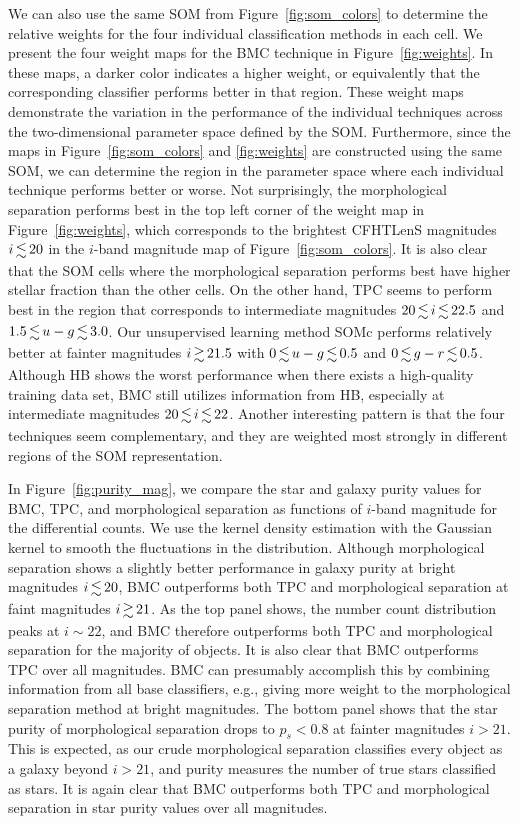\documentclass[useAMS,usenatbib]{mn2e}
\newcommand{\eg}{{e.g., }}
\begin{document}
We can also use the same SOM from Figure~\ref{fig:som_colors}
to determine the relative weights for 
the four individual classification methods in each cell.
We present the four weight maps for the BMC technique 
in Figure~\ref{fig:weights}.
In these maps, a darker color indicates a higher weight,
or equivalently that the corresponding classifier
performs better in that region.
These weight maps demonstrate the variation in
the performance of the individual techniques across
the two-dimensional parameter space defined by the SOM.
Furthermore, since the maps in Figure~\ref{fig:som_colors}
and \ref{fig:weights} are constructed using the same SOM,
we can determine the region in the parameter space
where each individual technique performs better or worse.
Not surprisingly, the morphological separation
performs best in the top left corner of the weight map
in Figure~\ref{fig:weights},
which corresponds to the brightest CFHTLenS magnitudes $i \la 20$
in the $i$-band magnitude map of Figure~\ref{fig:som_colors}.
It is also clear that the SOM cells where the morphological
separation performs best have higher stellar fraction than
the other cells. 
On the other hand, TPC seems to perform best
in the region that corresponds to intermediate magnitudes
$20\la i \la22.5$ and $1.5 \la u-g \la 3.0$.
Our unsupervised learning method SOMc
performs relatively better at fainter magnitudes $i \ga 21.5$
with $0 \la u-g \la 0.5$ and $0 \la g-r \la 0.5$.
Although HB shows the worst performance
when there exists a high-quality training data set,
BMC still utilizes information from HB,
especially at intermediate magnitudes $20\la i \la22$.
Another interesting pattern is that
the four techniques seem complementary,
and they are weighted most strongly in different regions
of the SOM representation.

In Figure~\ref{fig:purity_mag}, 
we compare the star and galaxy purity values
for BMC, TPC, and morphological separation
as functions of $i$-band magnitude for the differential counts.
We use the kernel density estimation \cite[KDE;][]{silverman1986density}
with the Gaussian kernel to smooth the fluctuations in the distribution.
Although morphological separation shows a slightly better performance
in galaxy purity at bright magnitudes $i \la 20$,
BMC outperforms both TPC and morphological separation
at faint magnitudes $i \ga 21$.
As the top panel shows,
the number count distribution peaks at $i \sim 22$,
and BMC therefore outperforms both TPC and morphological separation
for the majority of objects.
It is also clear that BMC outperforms TPC over all magnitudes.
BMC can presumably accomplish this by combining information from
all base classifiers,
\eg giving more weight to the morphological separation method
at bright magnitudes.
The bottom panel shows that
the star purity of morphological separation drops to $p_s < 0.8$
at fainter magnitudes $i > 21$.
This is expected, as our crude morphological separation classifies
every object as a galaxy beyond $i > 21$, and
purity measures the number of true stars classified as stars.
It is again clear that BMC outperforms both TPC and morphological separation
in star purity values over all magnitudes.
\end{document}
